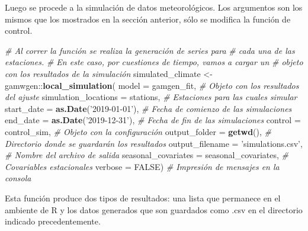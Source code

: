 \documentclass[
  12pt]{article}
\newenvironment{Shaded}{}{}
\newcommand{\CommentTok}[1]{\textcolor[rgb]{0.38,0.63,0.69}{\textit{#1}}}
\newcommand{\DataTypeTok}[1]{\textcolor[rgb]{0.56,0.13,0.00}{#1}}
\newcommand{\KeywordTok}[1]{\textcolor[rgb]{0.00,0.44,0.13}{\textbf{#1}}}
\newcommand{\NormalTok}[1]{#1}
\newcommand{\OperatorTok}[1]{\textcolor[rgb]{0.40,0.40,0.40}{#1}}
\newcommand{\OtherTok}[1]{\textcolor[rgb]{0.00,0.44,0.13}{#1}}
\newcommand{\StringTok}[1]{\textcolor[rgb]{0.25,0.44,0.63}{#1}}
\begin{document}
Luego se procede a la simulación de datos meteorológicos. Los argumentos son los mismos que los mostrados en la sección anterior, sólo se modifica la función de control.

\begin{Shaded}
\begin{Highlighting}[]
\CommentTok{# Al correr la función se realiza la generación de series para }
\CommentTok{# cada una de las estaciones. }
\CommentTok{# En este caso, por cuestiones de tiempo, vamos a cargar un }
\CommentTok{# objeto con los resultados de la simulación }
\NormalTok{simulated_climate <-}\StringTok{ }\NormalTok{gamwgen}\OperatorTok{::}\KeywordTok{local_simulation}\NormalTok{(}
  \DataTypeTok{model =}\NormalTok{ gamgen_fit, }
  \CommentTok{# Objeto con los resultados del ajuste}
  \DataTypeTok{simulation_locations =}\NormalTok{ stations,}
  \CommentTok{# Estaciones para las cuales simular}
  \DataTypeTok{start_date =} \KeywordTok{as.Date}\NormalTok{(}\StringTok{'2019-01-01'}\NormalTok{),}
  \CommentTok{# Fecha de comienzo de las simulaciones}
  \DataTypeTok{end_date =} \KeywordTok{as.Date}\NormalTok{(}\StringTok{'2019-12-31'}\NormalTok{), }
  \CommentTok{# Fecha de fin de las simulaciones}
  \DataTypeTok{control =}\NormalTok{ control_sim, }
  \CommentTok{# Objeto con la configuración}
  \DataTypeTok{output_folder =} \KeywordTok{getwd}\NormalTok{(), }
  \CommentTok{# Directorio donde se guardarán los resultados}
  \DataTypeTok{output_filename =} \StringTok{'simulations.csv'}\NormalTok{, }
  \CommentTok{# Nombre del archivo de salida}
  \DataTypeTok{seasonal_covariates =}\NormalTok{ seasonal_covariates, }
  \CommentTok{# Covariables estacionales}
  \DataTypeTok{verbose =} \OtherTok{FALSE}\NormalTok{) }
  \CommentTok{# Impresión de mensajes en la consola}
\end{Highlighting}
\end{Shaded}

Esta función produce dos tipos de resultados: una lista que permanece en el ambiente de R y los datos generados que son guardados como .csv en el directorio indicado precedentemente.
\end{document}
